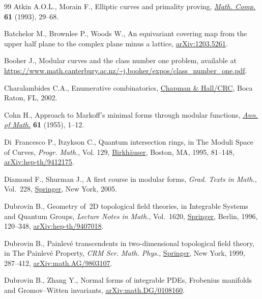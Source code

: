 \documentclass[11pt]{article}
\numberwithin{equation}{section}
\numberwithin{equation}{section}
\begin{document}
\begin{thebibliography}{99}
Atkin A.O.L., Morain F., Elliptic curves and primality proving,
 \href{https://doi.org/10.2307/2152935}{\textit{Math. Comp.}} \textbf{61}
 (1993), 29--68.

Batchelor M., Brownlee P., Woods W., An equivariant covering map from the upper
 half plane to the complex plane minus a lattice,
 \href{http://arxiv.org/abs/1203.5261}{arXiv:1203.5261}.

Booher J., Modular curves and the class number one problem, {a}vailable at
 \url{https://www.math.canterbury.ac.nz/~j.booher/expos/class_number_one.pdf}.

Charalambides C.A., Enumerative combinatorics,
 \href{https://doi.org/10.1201/9781315273112}{Chapman \& Hall/CRC}, Boca Raton,
 FL, 2002.

Cohn H., Approach to {M}arkoff's minimal forms through modular functions,
 \href{https://doi.org/10.2307/1969618}{\textit{Ann. of Math.}} \textbf{61}
 (1955), 1--12.

Di~Francesco P., Itzykson C., Quantum intersection rings, in The {M}oduli
 {S}pace of {C}urves, \textit{Progr. Math.}, Vol. 129,
 \href{https://doi.org/10.1007/978-1-4612-4264-2_4}{Birkh\"auser}, Boston, MA,
 1995, 81--148,
 \href{http://arxiv.org/abs/hep-th/9412175}{arXiv:hep-th/9412175}.

Diamond F., Shurman J., A first course in modular forms, \textit{Grad. Texts in
 Math.}, Vol.~228, \href{https://doi.org/10.1007/978-0-387-27226-9}{Springer},
 New York, 2005.

Dubrovin B., Geometry of~{$2$}{D} topological field theories, in Integrable
 {S}ystems and {Q}uantum {G}roups, \textit{Lecture Notes in Math.}, Vol.~1620,
 \href{https://doi.org/10.1007/BFb0094793}{Springer}, Berlin, 1996, 120--348,
 \href{http://arxiv.org/abs/hep-th/9407018}{arXiv:hep-th/9407018}.

Dubrovin B., Painlev\'e transcendents in two-dimensional topological field
 theory, in The {P}ainlev\'e Property, \textit{CRM Ser. Math. Phys.},
 \href{https://doi.org/10.1007/978-1-4612-1532-5_6}{Springer}, New York, 1999,
 287--412, \href{http://arxiv.org/abs/math.AG/9803107}{arXiv:math.AG/9803107}.

Dubrovin B., Zhang Y., Normal forms of integrable {PDE}s, {F}robenius manifolds
 and {G}romov--{W}itten invariants,
 \href{http://arxiv.org/abs/math.DG/0108160}{arXiv:math.DG/0108160}.


\end{thebibliography}
\end{document}
